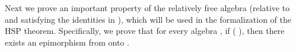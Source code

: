 \begin{code}
%
\>[2]\AgdaSpace{}%
\AgdaSymbol{:}\AgdaSpace{}%
\AgdaSpace{}%
\AgdaSymbol{\}}\AgdaSpace{}%
\AgdaSpace{}%
\AgdaSymbol{(}\AgdaSpace{}%
\AgdaSymbol{)}\AgdaSpace{}%
\AgdaSpace{}%
\AgdaSpace{}%
\AgdaSpace{}%
\AgdaSpace{}%
\AgdaSpace{}%
\AgdaSpace{}%
\AgdaSpace{}%
\AgdaSpace{}%
\AgdaSpace{}%
\AgdaSpace{}%
\AgdaSpace{}%
\<%
\\
%
\>[2]\AgdaSpace{}%
\AgdaSpace{}%
\AgdaSpace{}%
\AgdaSpace{}%
\AgdaSymbol{=}\AgdaSpace{}%
\AgdaSpace{}%
\AgdaSpace{}%
\AgdaSpace{}%
\AgdaSpace{}%
\AgdaSpace{}%
\AgdaSpace{}%
\AgdaSpace{}%
\AgdaSpace{}%
\AgdaSymbol{)}\AgdaSpace{}%
\AgdaSpace{}%
\AgdaSpace{}%
\AgdaSpace{}%
\AgdaSpace{}%
\AgdaSymbol{(}\AgdaSpace{}%
\AgdaSymbol{)}\AgdaSpace{}%
\<%
\\
\>[0]\<%
\end{code}
Next we prove an important property of the relatively free algebra
(relative to  and satisfying the identities in  ),
which will be used in the formalization of the HSP theorem. Specifically,
we prove that for every algebra , if    ( ),
then there exists an epimorphism from  onto .

